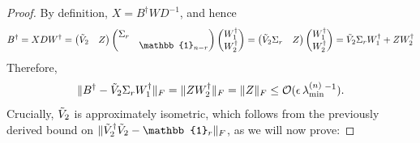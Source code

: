 \begin{proof}
By definition, $X=B^{\dag}WD^{-1}$, and hence
\begin{equation*}
B^{\dag}=XDW^{\dag} = 
\begin{pmatrix}
\Tilde{V}_2 & Z
\end{pmatrix}
\begin{pmatrix}
\Sigma_r &\\
& \mathbb{1}_{n-r}
\end{pmatrix}
\begin{pmatrix}
W_1^{\dag} \\ W_2^{\dag}
\end{pmatrix} = 
\begin{pmatrix}
\Tilde{V}_2 \Sigma_r & Z
\end{pmatrix}
\begin{pmatrix}
W_1^{\dag} \\ W_2^{\dag}
\end{pmatrix} = \Tilde{V}_2\Sigma_r W_1^{\dag} + ZW_2^{\dag}
\end{equation*}
Therefore,
\begin{equation*}
\|B^{\dag}-\Tilde{V}_2\Sigma_r W_1^{\dag}\|_F=\|ZW_2^{\dag}\|_F=\|Z\|_F\leq\mathcal{O}(\epsilon\thinspace \lambda_{\text{min}}^{(n)}{}^{-1}).
\end{equation*}
Crucially, $\Tilde{V}_2$ is approximately isometric, which follows from the previously derived bound on $\|\Tilde{V}_2^{\dag}\Tilde{V}_2 -\mathbb{1}_r\|_F$, as we will now prove:


\end{proof}
